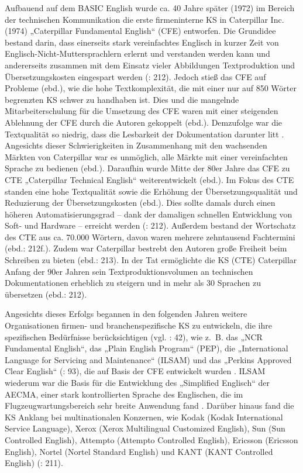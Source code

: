 Aufbauend auf dem BASIC English wurde ca. 40 Jahre später (1972) im Bereich der technischen Kommunikation die erste firmeninterne KS in Caterpillar Inc. (1974) „Caterpillar Fundamental English“ (CFE) entworfen. Die Grundidee bestand darin, dass einerseits stark vereinfachtes Englisch in kurzer Zeit von Englisch-Nicht-Muttersprachlern erlernt und verstanden werden kann und andererseits zusammen mit dem Einsatz vieler Abbildungen Textproduktion und Übersetzungskosten eingespart werden (\citealt{DrewerZiegler2014}: 212). Jedoch stieß das CFE auf Probleme (ebd.), wie die hohe Textkomplexität, die mit einer nur auf 850 Wörter begrenzten KS schwer zu handhaben ist. Dies und die mangelnde Mitarbeiterschulung für die Umsetzung des CFE waren mit einer steigenden Ablehnung der CFE durch die Autoren gekoppelt (ebd.). Demzufolge war die Textqualität so niedrig, dass die Lesbarkeit der Dokumentation darunter litt \citep{KamprathEtAl1998}. Angesichts dieser Schwierigkeiten in Zusammenhang mit den wachsenden Märkten von Caterpillar war es unmöglich, alle Märkte mit einer vereinfachten Sprache zu bedienen (ebd.). Daraufhin wurde Mitte der 80er Jahre das CFE zu CTE „Caterpillar Technical English“ weiterentwickelt (ebd.). Im Fokus des CTE standen eine hohe Textqualität sowie die Erhöhung der Übersetzungsqualität und Reduzierung der Übersetzungskosten (ebd.). Dies sollte damals durch einen höheren Automatisierungsgrad – dank der damaligen schnellen Entwicklung von Soft- und Hardware – erreicht werden (\citealt{DrewerZiegler2014}: 212). Außerdem bestand der Wortschatz des CTE aus ca. 70.000 Wörtern, davon waren mehrere zehntausend Fachtermini (ebd.: 212f.). Zudem war Caterpillar bestrebt den Autoren große Freiheit beim Schreiben zu bieten (ebd.: 213). In der Tat ermöglichte die KS (CTE) Caterpillar Anfang der 90er Jahren sein Textproduktionsvolumen an technischen Dokumentationen erheblich zu steigern und in mehr als 30 Sprachen zu übersetzen (ebd.: 212).

\largerpage
Angesichts dieses Erfolgs begannen in den folgenden Jahren weitere Organisationen firmen- und branchenspezifische KS zu entwickeln, die ihre spezifischen Bedürfnisse berücksichtigen (vgl. \citealt{Schwanke1991}: 42), wie z.~B. das „NCR Fundamental English“, das „Plain English Program“ (PEP), die „International Language for Servicing and Maintenance“ (ILSAM) und das „Perkins Approved Clear English“ (\citealt{DouglasHurst1996}: 93), die auf Basis der CFE entwickelt wurden \citep[42]{Schwanke1991}. ILSAM wiederum war die Basis für die Entwicklung des „Simplified Englisch“ der AECMA, einer stark kontrollierten Sprache des Englischen, die im Flugzeugwartungsbereich sehr breite Anwendung fand \citep[370]{Göpferich2008}. Darüber hinaus fand die KS Anklang bei multinationalen Konzernen, wie Kodak (Kodak International Service Language), Xerox (Xerox Multilingual Customized English), Sun (Sun Controlled English), Attempto (Attempto Controlled English), Ericsson (Ericsson English), Nortel (Nortel Standard English) und KANT (KANT Controlled English) (\citealt{DrewerZiegler2014}: 211).

